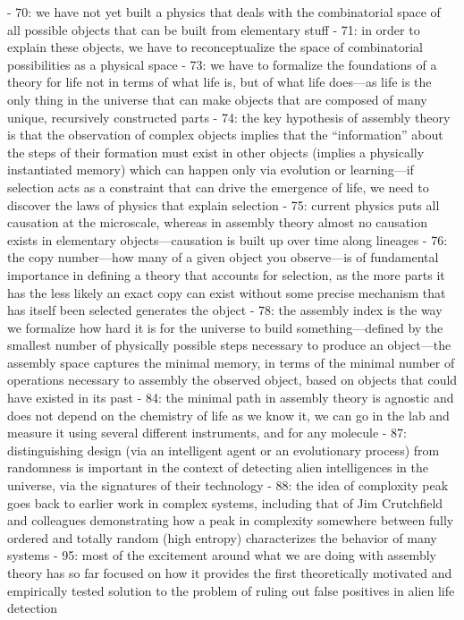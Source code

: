 \documentclass[11pt]{article}
\begin{document}
\begin{markdown}
- 70: we have not yet built a physics that deals with the combinatorial space of all possible objects that can be built from elementary stuff
- 71: in order to explain these objects, we have to reconceptualize the space of combinatorial possibilities as a physical space
- 73: we have to formalize the foundations of a theory for life not in terms of what life is, but of what life does—as life is the only thing in the universe that can make objects that are composed of many unique, recursively constructed parts
- 74: the key hypothesis of assembly theory is that the observation of complex objects implies that the “information” about the steps of their formation must exist in other objects (implies a physically instantiated memory) which can happen only via evolution or learning—if selection acts as a constraint that can drive the emergence of life, we need to discover the laws of physics that explain selection
- 75: current physics puts all causation at the microscale, whereas in assembly theory almost no causation exists in elementary objects—causation is built up over time along lineages
- 76: the copy number—how many of a given object you observe—is of fundamental importance in defining a theory that accounts for selection, as the more parts it has the less likely an exact copy can exist without some precise mechanism that has itself been selected generates the object
- 78: the assembly index is the way we formalize how hard it is for the universe to build something—defined by the smallest number of physically possible steps necessary to produce an object—the assembly space captures the minimal memory, in terms of the minimal number of operations necessary to assembly the observed object, based on objects that could have existed in its past
- 84: the minimal path in assembly theory is agnostic and does not depend on the chemistry of life as we know it, we can go in the lab and measure it using several different instruments, and for any molecule
- 87: distinguishing design (via an intelligent agent or an evolutionary process) from randomness is important in the context of detecting alien intelligences in the universe, via the signatures of their technology
- 88: the idea of comploxity peak goes back to earlier work in complex systems, including that of Jim Crutchfield and colleagues demonstrating how a peak in complexity somewhere between fully ordered and totally random (high entropy) characterizes the behavior of many systems
- 95: most of the excitement around what we are doing with assembly theory has so far focused on how it provides the first theoretically motivated and empirically tested solution to the problem of ruling out false positives in alien life detection

\end{markdown}
\end{document}
